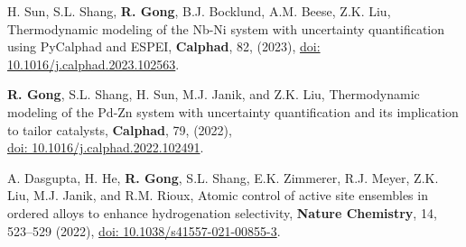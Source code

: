 \begin{etaremune}
\item H. Sun, S.L. Shang, \textbf{R. Gong}, B.J. Bocklund, A.M. Beese, Z.K. Liu, 
Thermodynamic modeling of the Nb-Ni system with uncertainty quantification using PyCalphad and ESPEI, 
\textbf{Calphad}, 82, (2023),
\href{https://doi.org/10.1016/j.calphad.2023.102563}{doi: 10.1016/j.calphad.2023.102563}.

\item \textbf{R. Gong}, S.L. Shang, H. Sun, M.J. Janik, and Z.K. Liu,
Thermodynamic modeling of the Pd-Zn system with uncertainty quantification and its implication to tailor catalysts, 
\textbf{Calphad}, 79, (2022),\\
\href{https://doi.org/10.1016/j.calphad.2022.102491}{doi: 10.1016/j.calphad.2022.102491}.

\item  A. Dasgupta, H. He, \textbf{R. Gong}, S.L. Shang, E.K. Zimmerer, R.J. Meyer, Z.K. Liu, M.J. Janik, and R.M. Rioux,
Atomic control of active site ensembles in ordered alloys to enhance hydrogenation selectivity, 
\textbf{Nature Chemistry}, 14, 523–529 (2022),
\href{https://doi.org/10.1038/s41557-021-00855-3}{doi: 10.1038/s41557-021-00855-3}.

\end{etaremune}
